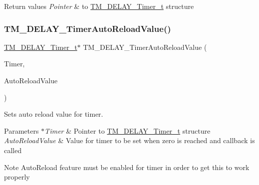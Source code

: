 \begin{DoxyRetVals}{Return values}
{\em Pointer} & to \hyperlink{group___t_m___d_e_l_a_y___typedefs_gaf0beeb077a757f34c8b176464d9a0e85}{T\+M\+\_\+\+D\+E\+L\+A\+Y\+\_\+\+Timer\+\_\+t} structure \\
\hline
\end{DoxyRetVals}
\mbox{\label{group___t_m___d_e_l_a_y___timer___functions_gaa9fdfeb8a094bdfec218134cba774b9e}} 
\subsubsection{\texorpdfstring{T\+M\+\_\+\+D\+E\+L\+A\+Y\+\_\+\+Timer\+Auto\+Reload\+Value()}{TM\_DELAY\_TimerAutoReloadValue()}}
{\footnotesize\ttfamily \hyperlink{group___t_m___d_e_l_a_y___typedefs_gaf0beeb077a757f34c8b176464d9a0e85}{T\+M\+\_\+\+D\+E\+L\+A\+Y\+\_\+\+Timer\+\_\+t}$\ast$ T\+M\+\_\+\+D\+E\+L\+A\+Y\+\_\+\+Timer\+Auto\+Reload\+Value (\begin{DoxyParamCaption}\item[{\hyperlink{group___t_m___d_e_l_a_y___typedefs_gaf0beeb077a757f34c8b176464d9a0e85}{T\+M\+\_\+\+D\+E\+L\+A\+Y\+\_\+\+Timer\+\_\+t} $\ast$}]{Timer,  }\item[{uint32\+\_\+t}]{Auto\+Reload\+Value }\end{DoxyParamCaption})}



Sets auto reload value for timer. 


\begin{DoxyParams}{Parameters}
{\em $\ast$\+Timer} & Pointer to \hyperlink{group___t_m___d_e_l_a_y___typedefs_gaf0beeb077a757f34c8b176464d9a0e85}{T\+M\+\_\+\+D\+E\+L\+A\+Y\+\_\+\+Timer\+\_\+t} structure \\
\hline
{\em Auto\+Reload\+Value} & Value for timer to be set when zero is reached and callback is called \\
\hline
\end{DoxyParams}
\begin{DoxyNote}{Note}
Auto\+Reload feature must be enabled for timer in order to get this to work properly 
\end{DoxyNote}

